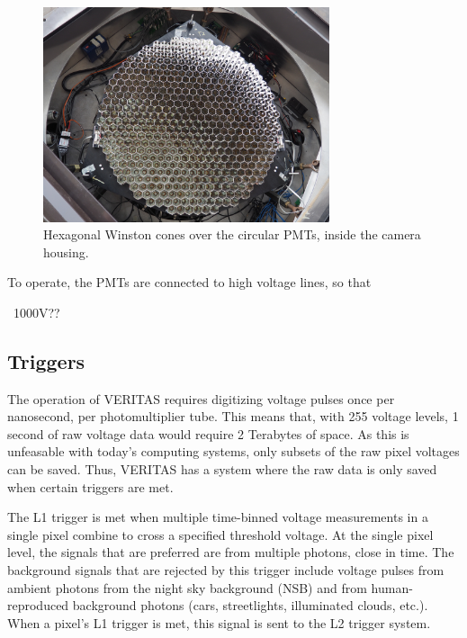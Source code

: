 \begin{figure}[h]
  \begin{center}
    \includegraphics[width=0.75\textwidth]{images/winston_cones_t2}
    \caption[Winston Cones]{Hexagonal Winston cones over the circular PMTs, inside the camera housing.}\label{fig:winstcones}
  \end{center}
\end{figure}

To operate, the PMTs are connected to high voltage lines, so that

~1000V??

\subsection{Triggers}\label{sec:trig}

The operation of VERITAS requires digitizing voltage pulses once per nanosecond, per photomultiplier tube.
This means that, with 255 voltage levels, 1 second of raw voltage data would require 2 Terabytes of space.
As this is unfeasable with today's computing systems, only subsets of the raw pixel voltages can be saved.
Thus, VERITAS has a system where the raw data is only saved when certain triggers are met.

The L1 trigger is met when multiple time-binned voltage measurements in a single pixel combine to cross a specified threshold voltage.
At the single pixel level, the signals that are preferred are from multiple photons, close in time.
The background signals that are rejected by this trigger include voltage pulses from ambient photons from the night sky background (NSB) and from human-reproduced background photons (cars, streetlights, illuminated clouds, etc.).
When a pixel's L1 trigger is met, this signal is sent to the L2 trigger system.

